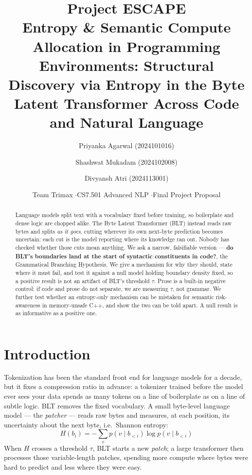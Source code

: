\title{\textbf{Project ESCAPE} \\[1pt]
\large Entropy \& Semantic Compute Allocation in Programming Environments:
Structural Discovery via Entropy in the Byte Latent Transformer
Across Code and Natural Language}

\author{Priyanka Agarwal \small (2024101016) \and Shashwat Mukadam \small (2024102008)
  \and Divyansh Atri \small (2024113001)}
\date{\small Team Trimax \quad$\cdot$\quad CS7.501 Advanced NLP \quad$\cdot$\quad Final Project Proposal}


\maketitle

\begin{abstract}
\noindent
Language models split text with a vocabulary fixed before training, so boilerplate and
dense logic are chopped alike. The Byte Latent Transformer (BLT)
\citep{pagnoni2024blt} instead reads raw bytes and splits \emph{as it goes}, cutting
wherever its own next-byte prediction becomes uncertain: each cut is the model reporting
where its knowledge ran out. Nobody has checked whether those cuts mean anything. We ask
a narrow, falsifiable version --- \textbf{do BLT's boundaries land at the start of
syntactic constituents in code?}, the Grammatical Branching Hypothesis. We give a
mechanism for why they should, state where it must fail, and test it against a null model
holding boundary density fixed, so a positive result is not an artifact of BLT's threshold
$\tau$. Prose is a built-in negative control: if code and prose do not
separate, we are measuring $\tau$, not grammar. We further test whether an entropy-only
mechanism can be mistaken for semantic risk-awareness in memory-unsafe C++, and show the
two can be told apart. A null result is as informative as a positive one.
\end{abstract}

\section{Introduction}

Tokenization has been the standard front end for language models for a decade, but it
fixes a compression ratio in advance: a tokenizer trained before the model ever sees your
data spends as many tokens on a line of boilerplate as on a line of subtle logic. BLT
removes the fixed vocabulary. A small byte-level language model --- the \emph{patcher} ---
reads raw bytes and measures, at each position, its uncertainty about the next byte, i.e.\
Shannon entropy:
\begin{equation}
H(b_i) = -\sum_v p(v \mid b_{<i}) \log p(v \mid b_{<i})
\label{eq:entropy}
\end{equation}
When $H$ crosses a threshold $\tau$, BLT starts a new \emph{patch}; a large transformer
then processes those variable-length patches, spending more compute where bytes were hard
to predict and less where they were easy.

